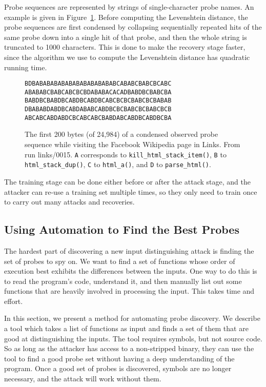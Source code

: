 \documentclass[letterpaper,twocolumn,10pt]{article}
\begin{document}
Probe sequences are represented by strings of single-character probe names. An
example is given in Figure~\ref{figure:probetext}. Before computing the
Levenshtein distance, the probe sequences are first condensed by collapsing
sequentially repeated hits of the same probe down into a single hit of that
probe, and then the whole string is truncated to 1000 characters. This is done
to make the recovery stage faster, since the algorithm we use to compute the
Levenshtein distance has quadratic running time.

\begin{figure}
    \centering
\begin{verbatim}
BDBABABABABABABABABABABABCABABCBABCBCABC
ABABABCBABCABCBCBDABABACACADBABDBCBABCBA
BABDBCBABDBCABDBCABDBCABCBCBCBABCBCBABAB
DBABABDABDBCABDABABCABDBCBCBABCBCBABCBCB
ABCABCABDABDCBCABCABCBABDABCABDBCABDBCBA
\end{verbatim}
\caption{The first 200 bytes (of 24,984) of a condensed observed probe sequence
    while visiting the Facebook Wikipedia page in Links. From run links/0015.
    \texttt{A} corresponds to \texttt{kill\_html\_stack\_item()}, \texttt{B} to
    \texttt{html\_stack\_dup()}, \texttt{C} to \texttt{html\_a()}, and
\texttt{D} to \texttt{parse\_html()}.} \label{figure:probetext}
\end{figure}

The training stage can be done either before or after the attack stage, and the
attacker can re-use a training set multiple times, so they only need to train
once to carry out many attacks and recoveries.

\subsection{Using Automation to Find the Best Probes}
\label{sec:automate}

The hardest part of discovering a new input distinguishing attack is finding the
set of probes to spy on. We want to find a set of functions whose order of
execution best exhibits the differences between the inputs. One way to do this
is to read the program's code, understand it, and then manually list out some
functions that are heavily involved in processing the input. This takes time and
effort. 

In this section, we present a method for automating probe discovery. We describe
a tool which takes a list of functions as input and finds a set of them that are
good at distinguishing the inputs. The tool requires symbols, but not source
code. So as long as the attacker has access to a non-stripped binary, they can
use the tool to find a good probe set without having a deep understanding of the
program. Once a good set of probes is discovered, symbols are no longer
necessary, and the attack will work without them.
\end{document}
